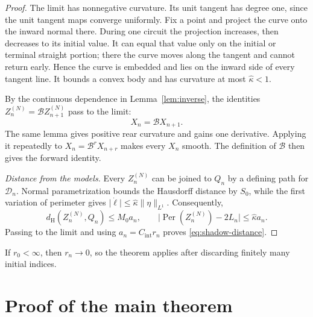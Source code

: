 \documentclass[11pt]{article}
\numberwithin{equation}{section}
\newcommand{\Bmap}{\mathcal B}
\newcommand{\abs}[1]{\lvert #1\rvert}
\newcommand{\norm}[1]{\lVert #1\rVert}
\DeclareMathOperator{\Per}{Per}
\begin{document}
\begin{proof}
The limit has nonnegative curvature. Its unit tangent has degree one, since
the unit tangent maps converge uniformly. Fix a point and project the curve
onto the inward normal there. During one circuit the projection increases,
then decreases to its initial value. It can equal that value only on the
initial or terminal straight portion; there the curve moves along the tangent
and cannot return early. Hence the curve is embedded and lies on the inward
side of every tangent line. It bounds a convex body and has curvature at most
\(\widehat\kappa<1\).

By the continuous dependence in Lemma~\ref{lem:inverse}, the identities
\(Z_n^{(N)}=\Bmap Z_{n+1}^{(N)}\) pass to the limit:
\[
  X_n=\Bmap X_{n+1}.
\]
The same lemma gives positive rear curvature and gains one derivative.
Applying it repeatedly to \(X_n=\Bmap^rX_{n+r}\) makes every \(X_n\)
smooth. The definition of \(\Bmap\) then gives the forward identity.

\emph{Distance from the models.}
Every \(Z_n^{(N)}\) can be joined to \(Q_n\) by a defining path for
\(\mathcal D_n\). Normal parametrization bounds the Hausdorff distance by
\(S_0\), while the first variation of perimeter gives
\(\abs{\dot\ell}\leq\widehat\kappa\norm{\eta}_{L^1}\). Consequently,
\[
  d_{\mathrm H}(Z_n^{(N)},Q_n)\leq M_0a_n,\qquad
  \abs{\Per(Z_n^{(N)})-2L_n}\leq\widehat\kappa a_n.
\]
Passing to the limit and using \(a_n=C_{\mathrm{int}}r_n\) proves
\eqref{eq:shadow-distance}.
\end{proof}

If \(r_0<\infty\), then \(r_n\to0\), so the theorem applies after
discarding finitely many initial indices.

\section{Proof of the main theorem}\label{sec:application}
\end{document}
